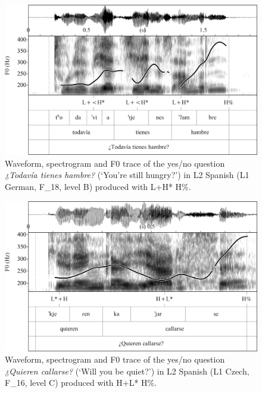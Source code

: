 \begin{figure}


\includegraphics[width=\textwidth]{figures/Figure_4.78.png}



\caption{Waveform, spectrogram and F0 trace of the yes/no question \textit{¿Todavía tienes hambre?} (‘You’re still hungry?’) in L2 Spanish (L1 German, F\_18, level B) produced with L+H* H\%.}
\label{fig:4.78}
\end{figure}

\begin{figure}


\includegraphics[width=\textwidth]{figures/Figure_4.79.png}



\caption{Waveform, spectrogram and F0 trace of the yes/no question \textit{¿Quieren callarse?} (‘Will you be quiet?’) in L2 Spanish (L1 Czech, F\_16, level C) produced with H+L* H\%.}
\label{fig:4.79}
\end{figure}

